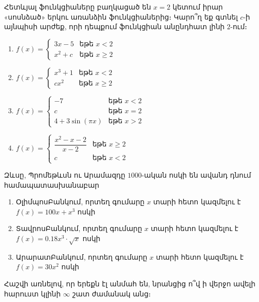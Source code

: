 \begin{problem}
Հետևյալ ֆունկցիաները բաղկացած են $x=2$ կետում իրար «սոսնձած» երկու առանձին ֆունկցիաներից։ Կարո՞ղ եք գտնել $c$-ի այնպիսի արժեք, որի դեպքում ֆունկցիան անընդհատ լինի $2$-ում։

\begin{enumerate}[label={\alph*}․]
\item {} $f(x)=\begin{cases} 3x-5& \text{եթե }x<2 \\  x^2+c& \text{եթե }x \ge 2 \end{cases}$

\item $
f(x)=\begin{cases} x^3+1& \text{եթե } x<2 \\  cx^2& \text{եթե } x \ge 2 \end{cases} $ 

\item $
f(x)=\begin{cases} -7& \text{եթե } x<2 \\ c& \text{եթե } x=2 \\  4+3\sin(\pi x)& \text{եթե } x>2 \end{cases} $
\bigskip

\item $
f(x)=\begin{cases} {\dfrac{x^2-x-2}{x-2}}& \text{եթե }x \ge 2 \\  c& \text{եթե }x<2 \end{cases} $

\end{enumerate}
\end{problem}


\begin{problem}
Զևսը, Պրոմեթևսն ու Արամազդը $1000$-ական ոսկի են ավանդ դնում համապատասխանաբար
\begin{enumerate}
    \item ՕլիմպոսԲանկում, որտեղ գումարը $x$ տարի հետո կազմելու է $f(x)=100x+x^3$ ոսկի
    \item ՏավրոսԲանկում, որտեղ գումարը $x$ տարի հետո կազմելու է $f(x)=0.18x^3\cdot \sqrt{x}$ ոսկի
    \item ԱրարատԲանկում, որտեղ գումարը $x$ տարի հետո կազմելու է $f(x)=30x^2$ ոսկի
\end{enumerate}

Հաշվի առնելով, որ երեքն էլ անմահ են, նրանցից ո՞վ ի վերջո ավելի հարուստ կլինի $\infty$ շատ ժամանակ անց։
\end{problem}

